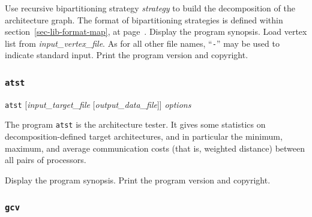\begin{itemize}
\progopt
\begin{itemize}
Use recursive bipartitioning strategy {\it strategy\/} to build the
decomposition of the architecture graph. The format of bipartitioning
strategies is defined within section~\ref{sec-lib-format-map},
at page~\pageref{sec-lib-format-bipart}.
\iteme[\texttt{-h}]
Display the program synopsis.
Load vertex list from {\it input\_vertex\_file}. As for all other file names,
``\texttt{-}'' may be used to indicate standard input.
\iteme[\texttt{-V}]
Print the program version and copyright.
\end{itemize}
\end{itemize}

\subsubsection{\texttt{atst}}

\begin{itemize}
\progsyn
\texttt{atst} [{\it input\_target\_file} [{\it output\_data\_file}]] {\it options}

\progdes
The program \texttt{atst} is the architecture tester. It gives some statistics on
decomposition-defined target architectures, and in particular the
minimum, maximum, and average communication costs (that is, weighted distance)
between all pairs of processors.

\progopt
\begin{itemize}
\iteme[\texttt{-h}]
Display the program synopsis.
\iteme[\texttt{-V}]
Print the program version and copyright.
\end{itemize}
\end{itemize}

\subsubsection{\texttt{gcv}}
\label{sec-prog-gcv}

